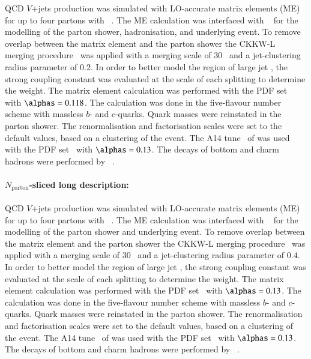 QCD $V$+jets production was simulated with LO-accurate matrix elements (ME) 
for up to four partons with \MGNLO[2.2.2]~\cite{Alwall:2014hca}. The ME calculation was interfaced with
\PYTHIA[8.186]~\cite{Sjostrand:2007gs} for the modelling of the parton
shower, hadronisation, and underlying event. To remove overlap between the matrix
element and the parton shower the CKKW-L merging
procedure~\cite{Lonnblad:2001iq,Lonnblad:2011xx} was applied with a
merging scale of 30~\GeV{} and a jet-clustering radius parameter of
$0.2$. In order to better model the region of large jet \pt, the
strong coupling constant \alphas was evaluated at the scale of each splitting to
determine the weight. The matrix element calculation was performed with
the \NNPDF[3.0nlo] PDF set~\cite{Ball:2014uwa} with $\alphas= 0.118$. The calculation was done
in the five-flavour number scheme with massless $b$- and
$c$-quarks. Quark masses were reinstated in the \PYTHIA[8] parton shower. 
The renormalisation and factorisation scales were set to the \MADGRAPH default
values, based on a clustering of the event. The A14
tune~\cite{ATL-PHYS-PUB-2014-021} of \PYTHIA[8] was used with the
\NNPDF[2.3lo] PDF set~\cite{Ball:2012cx} with $\alphas=0.13$.  
The decays of bottom and charm hadrons were performed by \EVTGEN[1.2.0]~\cite{Lange:2001uf}.

\paragraph{$N_\text{parton}$-sliced long description:}

QCD $V$+jets production was simulated with LO-accurate matrix elements (ME) for up to four partons with 
\MGNLO[2.2.2]~\cite{Alwall:2014hca}. The ME calculation was interfaced 
with \PYTHIA[8.186]~\cite{Sjostrand:2007gs} for the modelling of the parton
shower and underlying event. To remove overlap between the matrix
element and the parton shower the CKKW-L merging
procedure~\cite{Lonnblad:2001iq,Lonnblad:2011xx} was applied with a
merging scale of 30~\GeV{} and a jet-clustering radius parameter of
$0.4$. In order to better model the region of large jet \pt, the
strong coupling constant \alphas was evaluated at the scale of each splitting to
determine the weight. The matrix element calculation was performed with
the \NNPDF[2.3lo] PDF set~\cite{Ball:2012cx} with $\alphas= 0.13$. The calculation was done
in the five-flavour number scheme with massless $b$- and
$c$-quarks. Quark masses were reinstated in the \PYTHIA[8] parton shower. 
The renormalisation and factorisation scales were set to the \MADGRAPH default
values, based on a clustering of the event. The A14 tune~\cite{ATL-PHYS-PUB-2014-021} 
of \PYTHIA[8] was used with the \NNPDF[2.3lo] PDF set~\cite{Ball:2012cx} with $\alphas=0.13$.  
The decays of bottom and charm hadrons were performed by \EVTGEN[1.2.0]~\cite{Lange:2001uf}.

